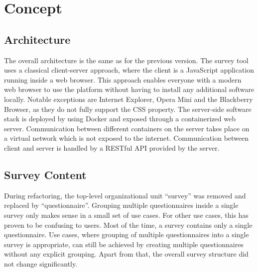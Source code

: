 \section{Concept}

\subsection{Architecture}
    The overall architecture is the same as for the previous version. The survey tool
    uses a classical client-server approach, where the client is a 
    JavaScript application running inside a web browser. This approach
    enables everyone with a modern web browser to use the platform without
    having to install any additional software locally. Notable exceptions
    are Internet Explorer, Opera Mini and the Blackberry Browser, as they
    do not fully support the CSS  property.
    The server-side software stack is deployed by using Docker and 
    exposed through a containerized web server.
    Communication between different containers on the server takes place
    on a virtual network which is not exposed to the internet. Communication
    between client and server is handled by a RESTful API provided
    by the server.

\subsection{Survey Content}
    During refactoring, the top-level organizational unit ``survey'' was removed
    and replaced by ``questionnaire''. Grouping multiple questionnaires
    inside a single survey only makes sense in a small set of use cases.
    For other use cases, this has proven to be confusing to users. Most of the time, 
    a survey contains only a single questionnaire. Use cases, where
    grouping of multiple questionnaires into a single survey is appropriate,
    can still be achieved by creating multiple questionnaires without any
    explicit grouping. Apart from that, the overall survey structure did not
    change significantly.

